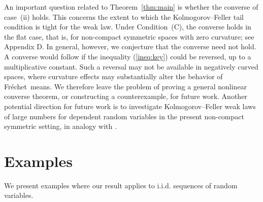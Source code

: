 \documentclass[preprint]{imsart}
\def\Frechet{Fr\'{e}chet}
\theoremstyle{plain}
\newtheorem{remark}{Remark}
\theoremstyle{remark}
\begin{document}


An important question related to Theorem~\ref{thm:main} is whether the
converse of case~(ii) holds. This concerns the extent to which the Kolmogorov--Feller tail condition is tight for the weak law. Under Condition~(C), the converse holds in the flat case, that is, for non-compact symmetric spaces with zero curvature; see Appendix D. In general, however, we conjecture that the converse need not hold. A converse would follow if the inequality (\ref{ineq:key}) could be reversed, up to a multiplicative constant. Such a reversal may not be available in negatively curved spaces, where curvature effects may substantially alter the behavior of \Frechet\ means. We therefore leave the problem of proving a general nonlinear converse theorem, or constructing a counterexample, for future work.
Another potential direction for future work is to investigate Kolmogorov--Feller weak laws of large numbers for dependent random variables in the present non-compact symmetric setting, in
analogy with \cite{naderi2020weak}. 


\section{Examples}

We present examples where our result applies to i.i.d. sequences of random variables. 
\end{document}
